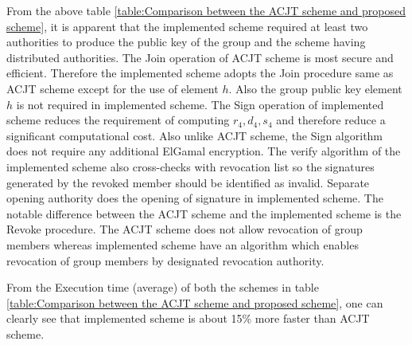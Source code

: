 From the above table \ref{table:Comparison between the ACJT scheme and proposed scheme}, it is apparent that the implemented scheme required at least two authorities to produce the public key of the group and the scheme having distributed authorities. The Join operation of ACJT scheme is most secure and efficient. Therefore the implemented scheme adopts the Join procedure same as ACJT scheme except for the use of element $h$. Also the group public key element $h$ is not required in implemented scheme. The Sign operation of implemented scheme reduces the requirement of computing $r_4, d_4, s_4$ and therefore reduce a significant computational cost. Also unlike ACJT scheme, the Sign algorithm does not require any additional ElGamal encryption. The verify algorithm of the implemented scheme also cross-checks with revocation list so the signatures generated by the revoked member should be identified as invalid. Separate opening authority does the opening of signature in implemented scheme. The notable difference between the ACJT scheme and the implemented scheme is the Revoke procedure. The ACJT scheme does not allow revocation of group members whereas implemented scheme have an algorithm which enables revocation of group members by designated revocation authority.

From the Execution time (average) of both the schemes in table \ref{table:Comparison between the ACJT scheme and proposed scheme}, one can clearly see that implemented scheme is about 15\% more faster than ACJT scheme.